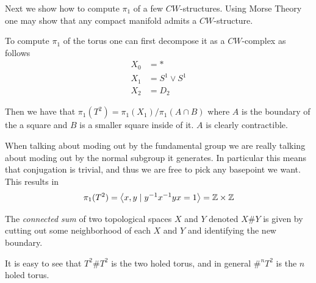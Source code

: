 \documentclass[11pt,leqno,oneside]{amsart}
\numberwithin{thm}{section}
\begin{document}
Next we show how to compute \(\pi_1\) of a few
\(CW\)-structures. Using Morse Theory one may show that any compact
manifold admits a \(CW\)-structure.

To compute \(\pi_1\) of the torus one can first decompose it as a
\(CW\)-complex as follows
\begin{align*}
  X_0 &= *\\
  X_1 &= S^1 \vee S^1\\
  X_2 &= D_2
\end{align*}

Then we have that \(\pi_1(T^2) = \pi_1(X_1)/\pi_1(A \cap B)\) where
\(A\) is the boundary of the a square and \(B\) is a smaller square
inside of it. \(A\) is clearly contractible.

When talking about moding out by the fundamental group we are really
talking about moding out by the normal subgroup it generates. In
particular this means that conjugation is trivial, and thus we are
free to pick any basepoint we want. This results in
\[\pi_1(T^2) = \left\langle x,y \mid y^{-1}x^{-1}y x = 1 \right\rangle = {\mathbb Z}
    \times {\mathbb Z}\]

\begin{defn}
  The \emph{connected sum} of two topological spaces \(X\) and \(Y\)
  denoted \(X \# Y \) is given by cutting out some neighborhood of
  each \(X\) and \(Y\) and identifying the new boundary.
\end{defn}


It is easy to see that \(T^2 \# T^2\) is the two holed torus, and in general \(\#^n T^2\) is the \(n\) holed torus.
\end{document}
